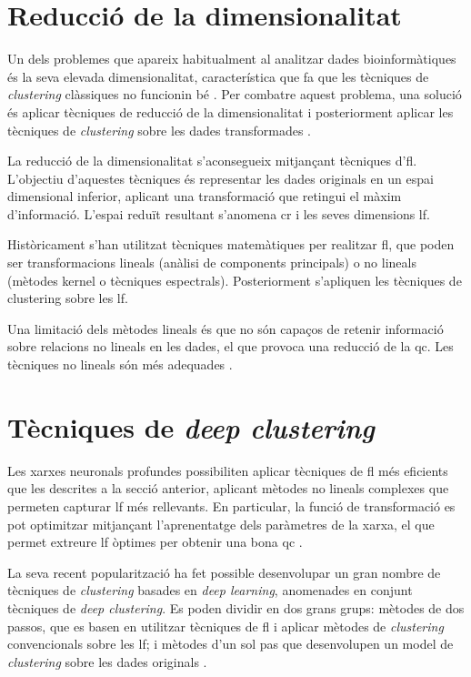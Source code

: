 \documentclass[CAT,BIB]{TFUOC}%
\begin{document}
    \section{Reducció de la dimensionalitat}
    \label{s:state_reduccio}

        Un dels problemes que apareix habitualment al analitzar dades bioinformàtiques és la seva elevada dimensionalitat, característica que fa que les tècniques de \textit{clustering} clàssiques no funcionin bé \citep{Masood2015, Karim2021}. Per combatre aquest problema, una solució és aplicar tècniques de reducció de la dimensionalitat i posteriorment aplicar les tècniques de \textit{clustering} sobre les dades transformades \citep{Min2018, Masood2015}.

        La reducció de la dimensionalitat s'aconsegueix mitjançant tècniques d'\gls{fl}. L'objectiu d'aquestes tècniques és representar les dades originals en un espai dimensional inferior, aplicant una transformació que retingui el màxim d'informació. L'espai reduït resultant s'anomena \gls{cr} i les seves dimensions \gls{lf}.

        Històricament s'han utilitzat tècniques matemàtiques per realitzar \gls{fl}, que poden ser transformacions lineals (anàlisi de components principals) o no lineals (mètodes kernel o tècniques espectrals). Posteriorment s'apliquen les tècniques de clustering sobre les \gls{lf}.

        Una limitació dels mètodes lineals és que no són capaços de retenir informació sobre relacions no lineals en les dades, el que provoca una reducció de la \gls{qc}. Les tècniques no lineals són més adequades \citep{Karim2021}.

    \section{Tècniques de \textit{deep clustering}}
    \label{s:state_deep}

        Les xarxes neuronals profundes possibiliten aplicar tècniques de \gls{fl} més eficients que les descrites a la secció anterior, aplicant mètodes no lineals complexes que permeten capturar \gls{lf} més rellevants. En particular, la funció de transformació es pot optimitzar mitjançant l'aprenentatge dels paràmetres de la xarxa, el que permet extreure \gls{lf} òptimes per obtenir una bona \gls{qc} \citep{Karim2021}.

        La seva recent popularització ha fet possible desenvolupar un gran nombre de tècniques de \textit{clustering} basades en \textit{deep learning}, anomenades en conjunt tècniques de \textit{deep clustering}. Es poden dividir en dos grans grups: mètodes de dos passos, que es basen en utilitzar tècniques de \gls{fl} i aplicar mètodes de \textit{clustering} convencionals sobre les \gls{lf}; i mètodes d'un sol pas que desenvolupen un model de \textit{clustering} sobre les dades originals \citep{Karim2021}.
\end{document}
